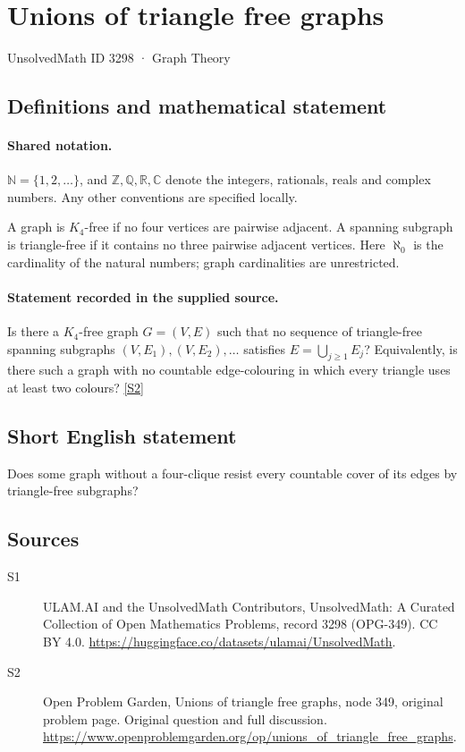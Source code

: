 \documentclass[11pt]{article}
\newcommand{\sref}[2]{\hyperlink{source:#1:#2}{[S#2]}}
\begin{document}
\setcounter{section}{3297}
\section{Unions of triangle free graphs}\label{3298}
{\small\sffamily UnsolvedMath ID 3298 · Graph Theory}
\subsection{Definitions and mathematical statement}

\paragraph{Shared notation.}$\mathbb N=\{1,2,\ldots\}$, and $\mathbb Z,\mathbb Q,\mathbb R,\mathbb C$ denote the integers, rationals, reals and complex numbers. Any other conventions are specified locally.


A graph is $K_4$-free if no four vertices are pairwise adjacent. A spanning subgraph is triangle-free if it contains no three pairwise adjacent vertices. Here $\aleph_0$ is the cardinality of the natural numbers; graph cardinalities are unrestricted.
\paragraph{Statement recorded in the supplied source.}
Is there a $K_4$-free graph $G=(V,E)$ such that no sequence of triangle-free spanning subgraphs $(V,E_1),(V,E_2),\ldots$ satisfies $E=\bigcup_{j\geq1}E_j$? Equivalently, is there such a graph with no countable edge-colouring in which every triangle uses at least two colours? \sref{3298}{2}
\subsection{Short English statement}
Does some graph without a four-clique resist every countable cover of its edges by triangle-free subgraphs?
\subsection{Sources}
\begin{description}
\item[\hypertarget{source:3298:1}{S1}] ULAM.AI and the UnsolvedMath Contributors, UnsolvedMath: A Curated Collection of Open Mathematics Problems, record 3298 (OPG-349). CC BY 4.0. \url{https://huggingface.co/datasets/ulamai/UnsolvedMath}.
\item[\hypertarget{source:3298:2}{S2}] Open Problem Garden, Unions of triangle free graphs, node 349, original problem page. Original question and full discussion. \url{https://www.openproblemgarden.org/op/unions_of_triangle_free_graphs}.

\end{description}
\label{end:3298}
\end{document}
